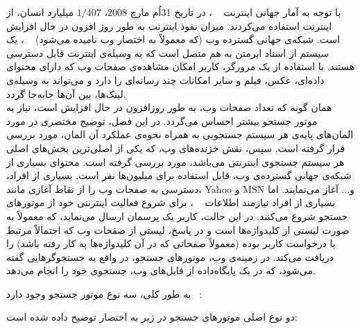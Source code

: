 
با توجه به آمار جهانی اینترنت
~\cite{Intenret-Stat}
، در تاریخ 31‌اُم مارچ 2008، $1/407$ میلیارد انسان، از اینترنت استفاده می‌کردند. میزان نفوذ اینترنت به طور روز افزون در حال افزایش است. شبکه‌ی جهانی گسترده وب (که معمولاً به اختصار وب نامیده می‌شود)
~\cite{Web-Crawling}
، یک سیستم از اسناد ابرمتن به هم متصل است که به وسیله‌ی اینترنت قابل دسترسی هستند. با استفاده از یک مرورگر، کاربر امکان مشاهده‌ی صفحات وب که دارای محتوای داده‌ای، عکس، فیلم و سایر امکانات چند رسانه‌ای را دارد و می‌تواند به وسیله‌ی لینک‌ها، بین آن‌ها جابه‌جا گردد.
\\
همان گونه که تعداد صفحات وب، به طور روزافزون در حال افزایش است، نیاز به موتور جستجو بیشتر احساس می‌گردد. در این فصل، توضیح مختصری در مورد المان‌های پایه‌ی هر سیستم جستجویی به همراه نحوه‌ی عملکرد آن المان، مورد بررسی قرار گرفته است. سپس، نقش خزنده‌های وب، که یکی از اصلی‌ترین بخش‌های اصلی هر سیستم جستجوی اینترنتی می‌باشد، مورد بررسی گرفته است.
محتوای بسیاری از شبکه‌ی جهانی گسترده‌ی وب، قابل استفاده برای میلیون‌ها نفر است. بسیاری از افراد، دسترسی به صفحات وب را از نقاط آغازی مانند، Yahoo و MSN و... آغاز می‌نمایند. اما بسیاری از افراد نیازمند اطلاعات
~\cite{User-Action}
، برای شروع فعالیت اینترنتی خود از موتورهای جستجو شروع می‌کنند. در این حالت، کاربر یک پرسمان ارسال می‌نماید، که معمولاً به صورت لیستی از کلیدواژه‌ها است و در پاسخ، لیستی از صفحات وب که احتمالاً مرتبط با درخواست کاربر بوده (معمولاً صفحاتی که در آن کلیدواژه‌ها  به کار رفته باشد) را دریافت می‌کند. در زمینه‌ی وب، موتورهای جستجو، در واقع به جستجوگرهایی گفته می‌شود، که در یک پایگاه‌داده‌ از فایل‌های وب، جستجوی خود را انجام می‌دهد.

به طور کلی، سه نوع موتور جستجو وجود دارد
~\cite{Web-Crawling}:





دو نوع اصلی موتورهای جستجو در زیر به اختصار توضیح داده شده است:

